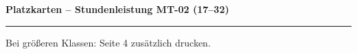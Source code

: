\documentclass[a4paper,11pt]{article}
\begin{document}
\newpage


\begin{center}

\vspace*{2mm}
{\fontsize{18}{22}\selectfont\bfseries\color{fachfarbe}Platzkarten – Stundenleistung MT-02 (17–32)}

\vspace{5mm}

\hspace{2mm}\hspace{2mm}\hspace{2mm}

\vspace{3mm}

\hspace{2mm}\hspace{2mm}\hspace{2mm}

\vspace{3mm}

\hspace{2mm}\hspace{2mm}\hspace{2mm}

\vspace{3mm}

\hspace{2mm}\hspace{2mm}\hspace{2mm}

\vspace{8mm}

{\color{gray}\hrule}

\vspace{4mm}

{\footnotesize\color{gray}Bei größeren Klassen: Seite 4 zusätzlich drucken.}

\end{center}

\newpage

\end{document}
